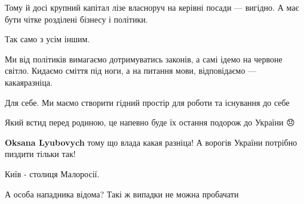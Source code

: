 \begin{itemize}
\begin{itemize}
Тому й досі крупний капітал лізе власноруч на керівні посади — вигідно. А має
бути чітке розділені бізнесу і політики.

Так само з усім іншим.

Ми від політиків вимагаємо дотримуватись законів, а самі ідемо на червоне
світло. Кидаємо сміття під ноги, а на питання мови, відповідаємо —
какаяразніца.

Для себе. Ми маємо створити гідний простір для роботи та існування до себе

\end{itemize}

 
Який встид перед родиною, це напевно буде їх остання подорож до України 😞

\begin{itemize}
 
\textbf{Oksana Lyubovych} тому що влада какая разніца! А ворогів України потрібно пиздити тільки так!
\end{itemize}

 
Київ - столиця Малоросії.

 
А особа нападника відома? Такі ж випадки не можна пробачати

\begin{itemize}
 

\end{itemize}
\end{itemize}
